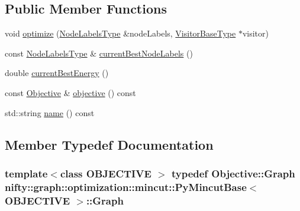 \subsection*{Public Member Functions}
\begin{DoxyCompactItemize}
\item 
void \hyperlink{classnifty_1_1graph_1_1optimization_1_1mincut_1_1PyMincutBase_a5fd5562ca5c2f681442050738754ccae}{optimize} (\hyperlink{classnifty_1_1graph_1_1optimization_1_1mincut_1_1PyMincutBase_a5ad1fd129bf9449a5f44b525b51a7be3}{Node\+Labels\+Type} \&node\+Labels, \hyperlink{classnifty_1_1graph_1_1optimization_1_1mincut_1_1PyMincutBase_ae4b7fb9386890597f91516f38b36c0b8}{Visitor\+Base\+Type} $\ast$visitor)
\item 
const \hyperlink{classnifty_1_1graph_1_1optimization_1_1mincut_1_1PyMincutBase_a5ad1fd129bf9449a5f44b525b51a7be3}{Node\+Labels\+Type} \& \hyperlink{classnifty_1_1graph_1_1optimization_1_1mincut_1_1PyMincutBase_a6e35fb92789105a38c1c90cdf613cf56}{current\+Best\+Node\+Labels} ()
\item 
double \hyperlink{classnifty_1_1graph_1_1optimization_1_1mincut_1_1PyMincutBase_a3d9c2116043245995c246a1b27d9b393}{current\+Best\+Energy} ()
\item 
const \hyperlink{classnifty_1_1graph_1_1optimization_1_1mincut_1_1PyMincutBase_a58f31d5b9739bc97189eeebbedb2026c}{Objective} \& \hyperlink{classnifty_1_1graph_1_1optimization_1_1mincut_1_1PyMincutBase_a8e0b2adecd928bb4e35b0c33334fc7b8}{objective} () const 
\item 
std\+::string \hyperlink{classnifty_1_1graph_1_1optimization_1_1mincut_1_1PyMincutBase_ac0809adf3acd325dc7a268bf948470bb}{name} () const 
\end{DoxyCompactItemize}


\subsection{Member Typedef Documentation}
\hypertarget{classnifty_1_1graph_1_1optimization_1_1mincut_1_1PyMincutBase_ab156fc8171dcce17d5277b53f12b6d14}{}
\subsubsection[{Graph}]{\setlength{\rightskip}{0pt plus 5cm}template$<$class O\+B\+J\+E\+C\+T\+I\+V\+E $>$ typedef Objective\+::\+Graph {\bf nifty\+::graph\+::optimization\+::mincut\+::\+Py\+Mincut\+Base}$<$ O\+B\+J\+E\+C\+T\+I\+V\+E $>$\+::{\bf Graph}}\label{classnifty_1_1graph_1_1optimization_1_1mincut_1_1PyMincutBase_ab156fc8171dcce17d5277b53f12b6d14}
\hypertarget{classnifty_1_1graph_1_1optimization_1_1mincut_1_1PyMincutBase_a4dea5f849cc7c483173f8a56aeb058ba}{}
